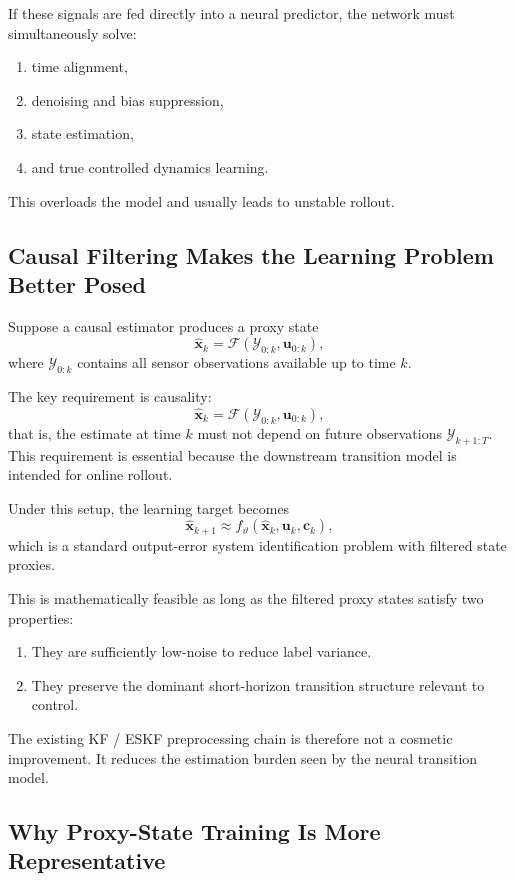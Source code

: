 If these signals are fed directly into a neural predictor, the network must simultaneously solve:

\begin{enumerate}
\item time alignment,
\item denoising and bias suppression,
\item state estimation,
\item and true controlled dynamics learning.
\end{enumerate}

This overloads the model and usually leads to unstable rollout.

\subsection{Causal Filtering Makes the Learning Problem Better Posed}

Suppose a causal estimator produces a proxy state
\[
\hat{\mathbf{x}}_k = \mathcal{F}( \mathcal{Y}_{0:k}, \mathbf{u}_{0:k}),
\]
where $\mathcal{Y}_{0:k}$ contains all sensor observations available up to time $k$.

The key requirement is causality:
\[
\hat{\mathbf{x}}_k = \mathcal{F}(\mathcal{Y}_{0:k}, \mathbf{u}_{0:k}),
\]
that is, the estimate at time $k$ must not depend on future observations $\mathcal{Y}_{k+1:T}$.
This requirement is essential because the downstream transition model is intended for online rollout.

Under this setup, the learning target becomes
\[
\hat{\mathbf{x}}_{k+1} \approx f_{\vartheta}(\hat{\mathbf{x}}_k, \mathbf{u}_k, \mathbf{c}_k),
\]
which is a standard output-error system identification problem with filtered state proxies.

This is mathematically feasible as long as the filtered proxy states satisfy two properties:

\begin{enumerate}
\item They are sufficiently low-noise to reduce label variance.
\item They preserve the dominant short-horizon transition structure relevant to control.
\end{enumerate}

The existing KF / ESKF preprocessing chain is therefore not a cosmetic improvement.
It reduces the estimation burden seen by the neural transition model.

\subsection{Why Proxy-State Training Is More Representative}

